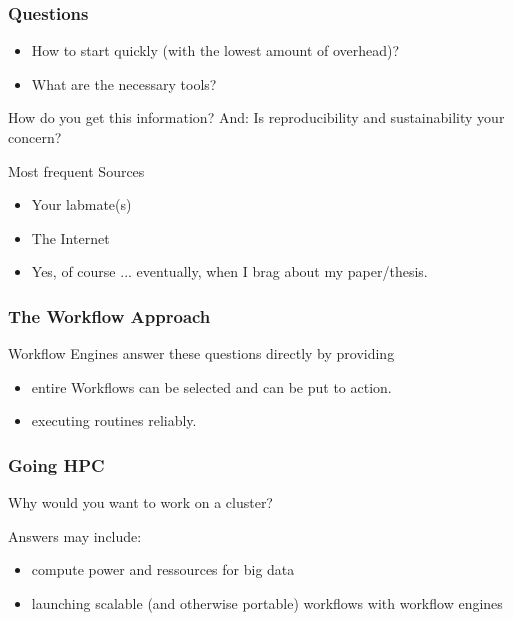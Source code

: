 \begin{frame}
  \frametitle{Questions}
  \begin{question}
  	\begin{itemize}
      \item How to start quickly (with the lowest amount of overhead)?
      \item What are the necessary tools?
    \end{itemize}
  \end{question}
                                                                               
  \begin{question}
  	 How do you get this information? And: Is reproducibility and sustainability your concern?
  \end{question}
  \pause
  \begin{block}{Most frequent Sources}
   \begin{itemize}
    \item Your labmate(s)
    \item The Internet
    \item Yes, of course ... eventually, when I brag about my paper/thesis.
   \end{itemize}
  \end{block}
\end{frame}

\begin{frame}
  \frametitle{The Workflow Approach}
  Workflow Engines answer these questions directly by providing
  \begin{itemize}
   \item entire Workflows can be selected and can be put to action.
   \item executing routines reliably.
  \end{itemize}
\end{frame}

\begin{frame}
  \frametitle{Going HPC}
  \begin{question}
  	Why would you want to work on a cluster?
  \end{question}
  \pause
  Answers may include:
  \begin{itemize}[<+->]
   \item compute power and ressources for big data
   \item launching scalable (and otherwise portable) workflows with workflow engines
  \end{itemize}
\end{frame}
